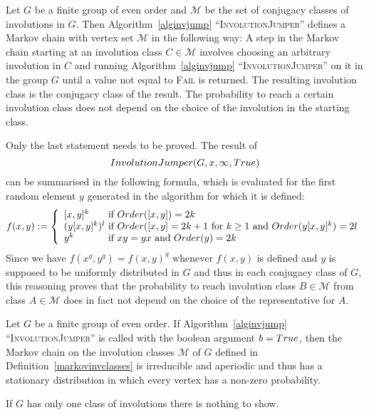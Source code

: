 \begin{DefProp}
%
\label{markovinvclasses}
Let $G$ be a finite group of even order and $\mathcal{M}$ be the set of
conjugacy classes of involutions in $G$. Then
Algorithm~\ref{alginvjump} ``\textsc{InvolutionJumper}'' defines a Markov
chain with vertex set $\mathcal{M}$ in the following way: A step in
the Markov chain starting at an involution class $C \in \mathcal{M}$
involves choosing an arbitrary involution in $C$ and running
Algorithm~\ref{alginvjump} ``\textsc{InvolutionJumper}'' on it in the group $G$
until a value not equal to \textsc{Fail} is returned. The resulting
involution class is the conjugacy class of the result. The
probability to reach a certain involution class does not depend on the
choice of the involution in the starting class.
\end{DefProp}
\proofbeg
Only the last statement needs to be proved. The result of
\[ \textsc{InvolutionJumper}(G,x,\infty,\textsc{True}) \] can
be summarised in the following formula, which is evaluated for the
first random element $y$ generated in the algorithm for which it is
defined:
\[ f(x,y)
    := \left\{ 
    \begin{array}{l@{\mbox{ if }}l}
        [x,y]^k & \textsc{Order}([x,y]) = 2k \\
        (y[x,y]^k)^l & \textsc{Order}([x,y]=2k+1 \mbox{ for } k \ge 1
                       \mbox{ and } \textsc{Order}(y[x,y]^k) = 2l \\
        y^k          & xy=yx \mbox{ and } \textsc{Order}(y) = 2k 
    \end{array}
    \right.
\]
Since we have $f(x^g,y^g) = f(x,y)^g$ whenever $f(x,y)$ is defined and
$y$ is supposed to be uniformly distributed in $G$ and thus in each
conjugacy class of $G$, this reasoning proves that the probability to
reach involution class $B \in \mathcal{M}$ from class $A \in
\mathcal{M}$ does in fact not depend on the choice of the
representative for $A$.
\proofend

\begin{Prop}
\label{markovinvlimit}
Let $G$ be a finite group of even order.
If Algorithm~\ref{alginvjump} ``\textsc{InvolutionJumper}'' is called with
the boolean argument $b = \textsc{True}$, then the Markov chain on the 
involution classes $\mathcal{M}$ of $G$ defined in
Definition~\ref{markovinvclasses} is irreducible and
aperiodic and thus has a stationary distribution in which every vertex
has a non-zero probability.
\end{Prop}
\proofbeg
If $G$ has only one class of involutions there is nothing to show.

